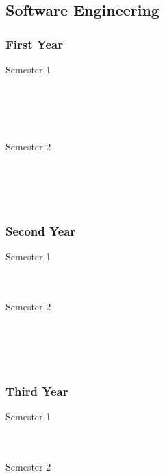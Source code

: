 \subsection{Software Engineering}

\subsubsection{First Year}
\begin{center}
\begin{multicols}{2}
Semester 1 \\
 \\
 \\
 \\
 \\
\vfill
\columnbreak

Semester 2 \\
 \\
 \\
 \\
 \\
\end{multicols}
\end{center}

\subsubsection{Second Year}
\begin{center}
\begin{multicols}{2}
Semester 1 \\
 \\
 \\
\vfill
\columnbreak

Semester 2 \\
 \\
 \\
 \\
 \\
\end{multicols}
\end{center}

\subsubsection{Third Year}
\begin{center}
\begin{multicols}{2}
Semester 1 \\
 \\
 \\
\vfill
\columnbreak

Semester 2 \\
 \\
\end{multicols}
\end{center}

